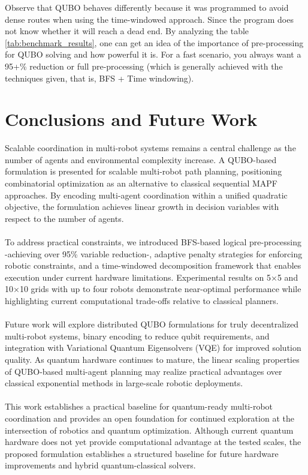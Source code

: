 \documentclass[11pt]{article}
\begin{document}
\FloatBarrier
Observe that QUBO behaves differently because it was programmed to avoid dense routes when using the time-windowed approach. Since the program does not know whether it will reach a dead end. By analyzing the table \ref{tab:benchmark_results}, one can get an idea of the importance of pre-processing for QUBO solving and how powerful it is. For a fast scenario, you always want a 95+\% reduction or full pre-processing (which is generally achieved with the techniques given, that is, BFS + Time windowing).

\FloatBarrier
\section{Conclusions and Future Work}

Scalable coordination in multi-robot systems remains a central challenge as the number of agents and environmental complexity increase. A QUBO-based formulation is presented for scalable multi-robot path planning, positioning combinatorial optimization as an alternative to classical sequential MAPF approaches. By encoding multi-agent coordination within a unified quadratic objective, the formulation achieves linear growth in decision variables with respect to the number of agents.\\
\\
To address practical constraints, we introduced BFS-based logical pre-processing -achieving over 95\% variable reduction-, adaptive penalty strategies for enforcing robotic constraints, and a time-windowed decomposition framework that enables execution under current hardware limitations. Experimental results on 5×5 and 10×10 grids with up to four robots demonstrate near-optimal performance while highlighting current computational trade-offs relative to classical planners.\\
\\
Future work will explore distributed QUBO formulations for truly decentralized multi-robot systems, binary encoding to reduce qubit requirements, and integration with Variational Quantum Eigensolvers (VQE) for improved solution quality. As quantum hardware continues to mature, the linear scaling properties of QUBO-based multi-agent planning may realize practical advantages over classical exponential methods in large-scale robotic deployments.\\
\\
This work establishes a practical baseline for quantum-ready multi-robot coordination and provides an open foundation for continued exploration at the intersection of robotics and quantum optimization. Although current quantum hardware does not yet provide computational advantage at the tested scales, the proposed formulation establishes a structured baseline for future hardware improvements and hybrid quantum-classical solvers.\\
\\
\end{document}
